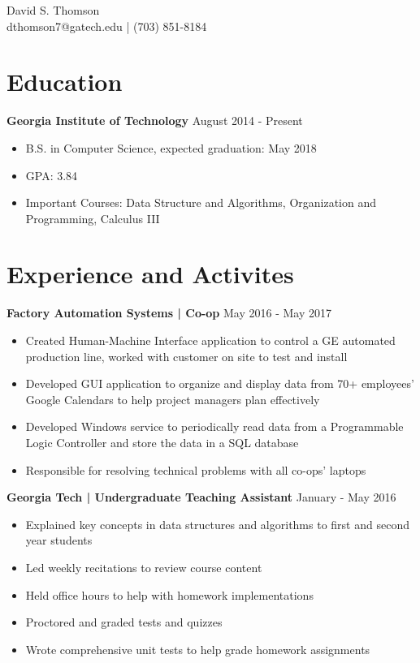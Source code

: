 \documentclass[11pt]{article}
\newcommand{\pipe}{| }
\begin{document}
\begin{center}
\vspace*{0.3em}
{\huge David S. Thomson} \\
\vspace*{1em}
dthomson7@gatech.edu \pipe (703) 851-8184
\end{center}

\section*{Education}
\textbf{Georgia Institute of Technology} \hfill August 2014 - Present
\begin{itemize}
    \item B.S. in Computer Science, expected graduation: May 2018
    \item GPA: 3.84
    \item Important Courses: Data Structure and Algorithms, Organization and Programming, Calculus III %
\end{itemize}

\section*{Experience and Activites}
\textbf{Factory Automation Systems \pipe Co-op} \hfill May 2016 - May 2017
\begin{itemize}
    \item Created Human-Machine Interface application to control a GE automated production line, worked with customer on site to test and install
    \item Developed GUI application to organize and display data from 70+ employees' Google Calendars to help project managers plan effectively
    \item Developed Windows service to periodically read data from a Programmable Logic Controller and store the data in a SQL database
    \item Responsible for resolving technical problems with all co-ops' laptops
\end{itemize}

\vspace{3pt}

\textbf{Georgia Tech \pipe Undergraduate Teaching Assistant} \hfill January - May 2016
\begin{itemize}
    \item Explained key concepts in data structures and algorithms to first and second year students
    \item Led weekly recitations to review course content
    \item Held office hours to help with homework implementations
    \item Proctored and graded tests and quizzes
    \item Wrote comprehensive unit tests to help grade homework assignments
\end{itemize}
\end{document}
